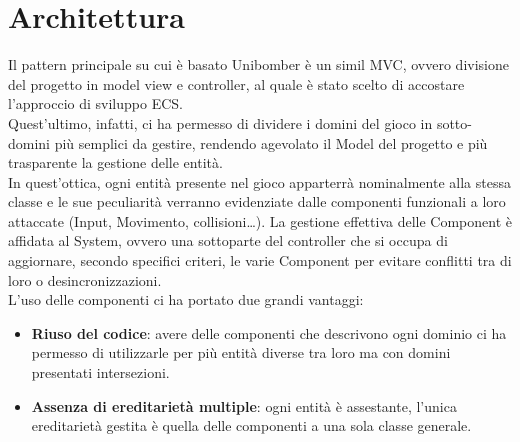 \documentclass[a4paper,12pt]{report}
\begin{document}
\section{Architettura}
Il pattern principale su cui è basato Unibomber è un simil MVC, ovvero divisione del progetto in model view e controller, al quale è stato scelto di accostare l'approccio di sviluppo ECS.
\\
Quest’ultimo, infatti, ci ha permesso di dividere i domini del gioco in sotto-domini più semplici da gestire, rendendo agevolato il Model del progetto e più trasparente la gestione delle entità.
\\
In quest’ottica, ogni entità presente nel gioco apparterrà nominalmente alla stessa classe e le sue peculiarità verranno evidenziate dalle componenti funzionali a loro attaccate (Input, Movimento, collisioni…). La gestione effettiva delle Component è affidata al System, ovvero una sottoparte del controller che si occupa di aggiornare, secondo specifici criteri, le varie Component per evitare conflitti tra di loro o desincronizzazioni.
\\
L’uso delle componenti ci ha portato due grandi vantaggi:
\begin{itemize}
    \item \textbf{Riuso del codice}: avere delle componenti che descrivono ogni dominio ci ha permesso di utilizzarle per più entità diverse tra loro ma con domini presentati intersezioni.
    \item \textbf{Assenza di ereditarietà multiple}: ogni entità è assestante, l’unica ereditarietà gestita è quella delle componenti a una sola classe generale.
\end{itemize}
\end{document}
